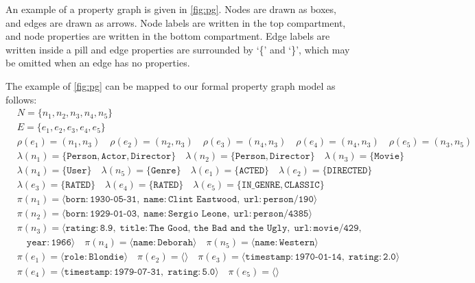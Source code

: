 \documentclass{report}
\theoremstyle{definition}
\begin{document}
An example of a property graph is given in \autoref{fig:pg}. Nodes are drawn as boxes, and edges are drawn as arrows. Node labels are written in the top compartment, and node properties are written in the bottom compartment. Edge labels are written inside a pill and edge properties are surrounded by `\{' and `\}', which may be omitted when an edge has no properties.

The example of \autoref{fig:pg} can be mapped to our formal property graph model as follows:
\begin{align*}
  &N = \{n_1, n_2, n_3, n_4, n_5\}\\
  &E = \{e_1, e_2, e_3, e_4, e_5\}\\
  &\rho(e_1) = (n_1, n_3) \quad \rho(e_2) = (n_2, n_3) \quad \rho(e_3) = (n_4, n_3) \quad \rho(e_4) = (n_4, n_3) \quad \rho(e_5) = (n_3, n_5)\\
  &\lambda(n_1) = \{\texttt{Person}, \texttt{Actor}, \texttt{Director}\} \quad \lambda(n_2) = \{\texttt{Person}, \texttt{Director}\} \quad \lambda(n_3) = \{\texttt{Movie}\}\\
  &\lambda(n_4) = \{\texttt{User}\} \quad \lambda(n_5) = \{\texttt{Genre}\} \quad \lambda(e_1) = \{\texttt{ACTED}\} \quad \lambda(e_2) = \{\texttt{DIRECTED}\}\\
  &\lambda(e_3) = \{\texttt{RATED}\} \quad \lambda(e_4) = \{\texttt{RATED}\} \quad \lambda(e_5) = \{\texttt{IN\_GENRE}, \texttt{CLASSIC}\}\\
  &\pi(n_1) = \langle \texttt{born} : \texttt{1930-05-31},\;\texttt{name} : \texttt{Clint Eastwood},\;\texttt{url} : \texttt{person/190} \rangle\\
  &\pi(n_2) = \langle \texttt{born} : \texttt{1929-01-03},\;\texttt{name} : \texttt{Sergio Leone},\;\texttt{url} : \texttt{person/4385} \rangle\\
  &\pi(n_3) = \langle \texttt{rating} : \texttt{8.9},\;\texttt{title} : \texttt{The Good, the Bad and the Ugly},\;\texttt{url} : \texttt{movie/429},\\
  &\quad\texttt{year} : \texttt{1966} \rangle \quad \pi(n_4) = \langle \texttt{name} : \texttt{Deborah} \rangle \quad \pi(n_5) = \langle \texttt{name} : \texttt{Western} \rangle\\
  &\pi(e_1) = \langle \texttt{role} : \texttt{Blondie} \rangle \quad \pi(e_2) = \langle\rangle \quad \pi(e_3) = \langle \texttt{timestamp} : \texttt{1970-01-14},\;\texttt{rating} : \texttt{2.0}\rangle\\
  &\pi(e_4) = \langle \texttt{timestamp} : \texttt{1979-07-31},\;\texttt{rating} : \texttt{5.0}\rangle \quad \pi(e_5) = \langle\rangle
\end{align*}
\end{document}
